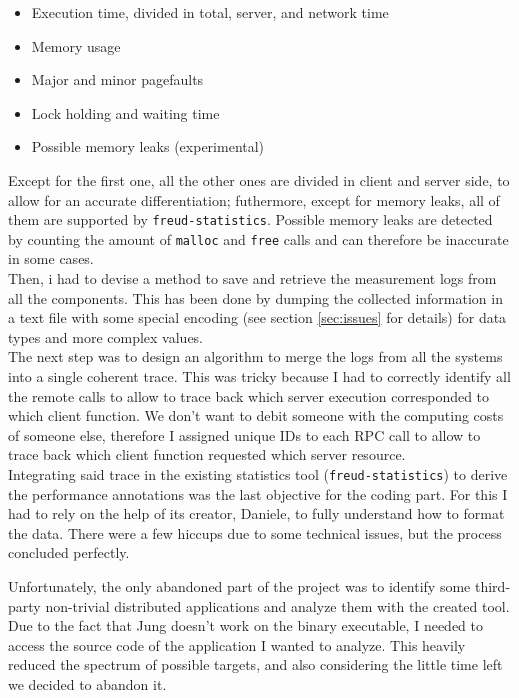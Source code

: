         \begin{itemize}
            \item Execution time, divided in total, server, and network time
            \item Memory usage
            \item Major and minor pagefaults
            \item Lock holding and waiting time
            \item Possible memory leaks (experimental)
        \end{itemize}

        Except for the first one, all the other ones are divided in client and server side, to allow for an
        accurate differentiation; futhermore, except for memory leaks, all of them are supported by 
        \texttt{freud-statistics}. Possible memory leaks are detected by counting the amount of \texttt{malloc}
        and \texttt{free} calls and can therefore be inaccurate in some cases.\\

        Then, i had to devise a method to save and retrieve the measurement logs from all the components.
        This has been done by dumping the collected information in a text file with some special encoding
        (see section \ref{sec:issues} for details) for data types and more complex values.\\

        The next step was to design an algorithm to merge the logs from all the systems into a single
        coherent trace. This was tricky because I had to correctly identify all the remote calls to allow
        to trace back which server execution corresponded to which client function. We don't want to debit
        someone with the computing costs of someone else, therefore I assigned unique IDs to each
        RPC call to allow to trace back which client function requested which server resource.\\

        Integrating said trace in the existing statistics tool (\texttt{freud-statistics}) to derive
        the performance annotations was the last objective for the coding part. For this I had to rely on the
        help of its creator, Daniele, to fully understand how to format the data. There were a few hiccups due to
        some technical issues, but the process concluded perfectly.

        Unfortunately, the only abandoned part of the project was to identify some third-party non-trivial
        distributed applications and analyze them with the created tool. Due to the fact that Jung doesn't work 
        on the binary executable, I needed to access the source code of the application I wanted to 
        analyze. This heavily reduced the spectrum of possible targets, and also considering the little time left we
        decided to abandon it.\\

